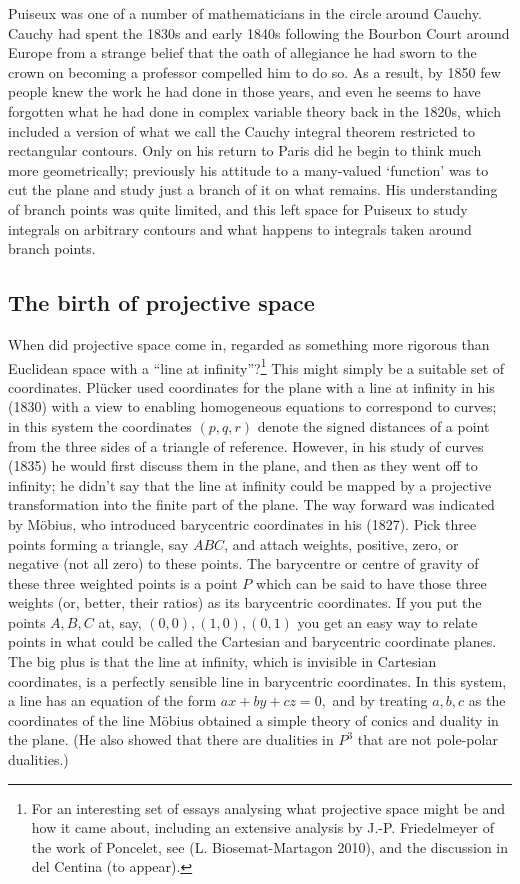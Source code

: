 Puiseux was one of a number of mathematicians in the circle around Cauchy. Cauchy had spent the 1830s and early 1840s following the Bourbon Court around Europe from a strange belief that the oath of allegiance he had sworn to the crown on becoming a professor compelled him to do so. As a result, by 1850 few people knew the work he had done in those years, and even he seems to have forgotten what he had done in complex variable theory back in the 1820s, which included a version of what we call the Cauchy integral theorem restricted to rectangular contours. Only on his return to Paris did he begin to think much more geometrically; previously his attitude to a many-valued `function' was to cut the plane and study just a branch of it on what remains. His understanding of branch points was quite limited, and this left space for Puiseux to study integrals on arbitrary contours   and what happens to integrals taken around branch points. 

\subsection{The birth of projective space}
When did projective space come in, regarded as something more rigorous than Euclidean space with a ``line at infinity''?\footnote{For an interesting  set of essays analysing what projective space might be and how it came about, including an extensive analysis by J.-P. Friedelmeyer of the work of Poncelet, see (L. Biosemat-Martagon 2010), and the discussion in del Centina (to appear).}
 This might simply be a suitable set of coordinates. Pl\"ucker used coordinates for the plane with a line at infinity in his (1830) with a view to enabling homogeneous equations to correspond to curves; in this system the coordinates $(p, q, r)$ denote the signed distances of a point from the three sides of a triangle of reference. However, in his study of curves (1835) he would first discuss them in  the plane, and then as they went off to infinity; he didn't say that the line at infinity could be mapped by a projective transformation into the finite part of the plane.  The way forward was indicated by M\"obius, who introduced barycentric coordinates in his (1827). Pick three points forming a triangle, say $ABC$, and attach weights, positive, zero, or negative (not all zero) to these points. The barycentre or centre of gravity of these three weighted points is a point $P$ which can be said to have those three weights (or, better, their ratios) as its barycentric coordinates. If you put the points $A, B, C$ at, say,  $(0, 0), (1, 0), (0, 1)$ you get an easy way to relate points in what could be called the Cartesian and barycentric coordinate planes. The big plus is that the line at infinity, which is invisible in Cartesian coordinates, is a perfectly sensible line in barycentric coordinates. In this system, a line has an equation of the form $ax+by+cz=0,$ and by treating $a, b, c$ as the coordinates of the line M\"obius obtained a simple theory of conics and duality in the plane. (He also showed that there are dualities in $P^3$ that are not pole-polar dualities.)

